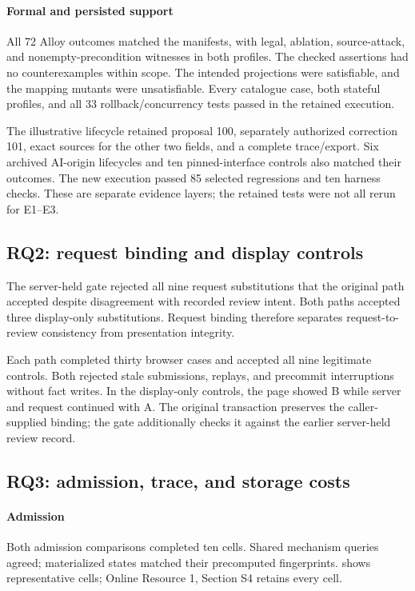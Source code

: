 \paragraph{Formal and persisted support}
All 72 Alloy outcomes matched the manifests, with legal, ablation, source-attack, and nonempty-precondition witnesses in both profiles. The checked assertions had no counterexamples within scope. The intended projections were satisfiable, and the mapping mutants were unsatisfiable. Every catalogue case, both stateful profiles, and all 33 rollback/concurrency tests passed in the retained execution.

The illustrative lifecycle retained proposal 100, separately authorized correction 101, exact sources for the other two fields, and a complete trace/export. Six archived AI-origin lifecycles and ten pinned-interface controls also matched their outcomes. The new execution passed 85 selected regressions and ten harness checks. These are separate evidence layers; the retained tests were not all rerun for E1--E3.

\subsection{RQ2: request binding and display controls}

The server-held gate rejected all nine request substitutions that the original path accepted despite disagreement with recorded review intent. Both paths accepted three display-only substitutions. Request binding therefore separates request-to-review consistency from presentation integrity.



Each path completed thirty browser cases and accepted all nine legitimate controls. Both rejected stale submissions, replays, and precommit interruptions without fact writes. In the display-only controls, the page showed B while server and request continued with A. The original transaction preserves the caller-supplied binding; the gate additionally checks it against the earlier server-held review record.

\subsection{RQ3: admission, trace, and storage costs}

\paragraph{Admission}
Both admission comparisons completed ten cells. Shared mechanism queries agreed; materialized states matched their precomputed fingerprints.  shows representative cells; Online Resource 1, Section S4 retains every cell.

